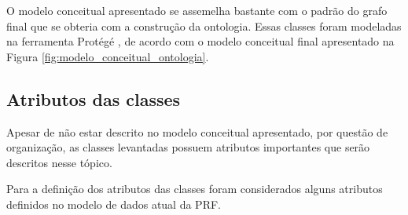 	  O modelo conceitual apresentado se assemelha bastante com o padrão do grafo final que se obteria com a construção da
	  ontologia.
	  Essas classes foram modeladas na ferramenta Protégé \footnotemark[2], de acordo com o modelo conceitual final
	  apresentado na Figura \ref{fig:modelo_conceitual_ontologia}.

      
      \vfill
      \pagebreak
      \subsection{Atributos das classes}
	
	  Apesar de não estar descrito no modelo conceitual apresentado, por questão de organização, as classes levantadas
	  possuem atributos importantes que serão descritos nesse tópico.
	  
	  Para a definição dos atributos das classes foram considerados alguns atributos definidos no modelo de dados atual
	  da PRF.
	  
	  
